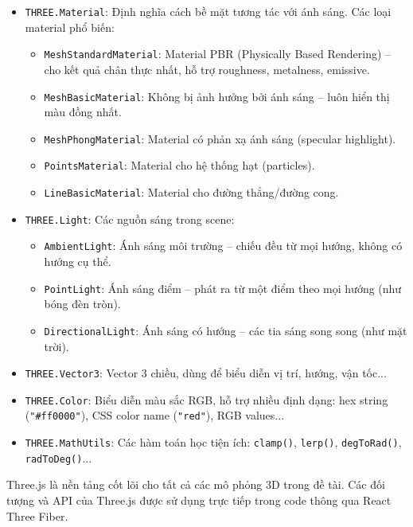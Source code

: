 \begin{itemize}
    \item \texttt{THREE.Material}: Định nghĩa cách bề mặt tương tác với ánh sáng. Các loại material phổ biến:
    \begin{itemize}
        \item \texttt{MeshStandardMaterial}: Material PBR (Physically Based Rendering) – cho kết quả chân thực nhất, hỗ trợ roughness, metalness, emissive.
        \item \texttt{MeshBasicMaterial}: Không bị ảnh hưởng bởi ánh sáng – luôn hiển thị màu đồng nhất.
        \item \texttt{MeshPhongMaterial}: Material có phản xạ ánh sáng (specular highlight).
        \item \texttt{PointsMaterial}: Material cho hệ thống hạt (particles).
        \item \texttt{LineBasicMaterial}: Material cho đường thẳng/đường cong.
    \end{itemize}
    
    \item \texttt{THREE.Light}: Các nguồn sáng trong scene:
    \begin{itemize}
        \item \texttt{AmbientLight}: Ánh sáng môi trường – chiếu đều từ mọi hướng, không có hướng cụ thể.
        \item \texttt{PointLight}: Ánh sáng điểm – phát ra từ một điểm theo mọi hướng (như bóng đèn tròn).
        \item \texttt{DirectionalLight}: Ánh sáng có hướng – các tia sáng song song (như mặt trời).
    \end{itemize}
    
    \item \texttt{THREE.Vector3}: Vector 3 chiều, dùng để biểu diễn vị trí, hướng, vận tốc...
    
    \item \texttt{THREE.Color}: Biểu diễn màu sắc RGB, hỗ trợ nhiều định dạng: hex string (\texttt{"\#ff0000"}), CSS color name (\texttt{"red"}), RGB values...
    
    \item \texttt{THREE.MathUtils}: Các hàm toán học tiện ích: \texttt{clamp()}, \texttt{lerp()}, \texttt{degToRad()}, \texttt{radToDeg()}...
\end{itemize}

Three.js là nền tảng cốt lõi cho tất cả các mô phỏng 3D trong đề tài. Các đối tượng và API của Three.js được sử dụng trực tiếp trong code thông qua React Three Fiber.

